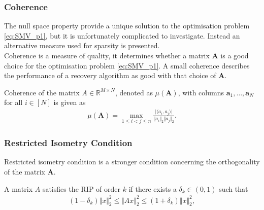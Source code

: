 \subsubsection{Coherence}
The null space property provide a unique solution to the optimisation problem \eqref{eq:SMV_p1}, but it is unfortunately complicated to investigate. Instead an alternative measure used for sparsity is presented.
\\
Coherence is a measure of quality, it determines whether a matrix $\mathbf{A}$ is a good choice for the optimisation problem \eqref{eq:SMV_p1}. A small coherence describes the performance of a recovery algorithm as good with that choice of $\mathbf{A}$. 
\begin{definition}[Coherence]
Coherence of the matrix $A \in \mathbb{R}^{M \times N}$, denoted as $\mu (\mathbf{A})$, with columns $\mathbf{a}_1, \dots, \mathbf{a}_N$ for all $i \in [N]$ is given as
\begin{align*}
\mu (\mathbf{A}) = \max_{1 \leq i < j \leq n} \frac{\vert \langle a_i, a_j \rangle \vert}{\Vert a_i \Vert_2 \Vert a_j \Vert_2}.
\end{align*}
\end{definition}

\subsubsection{Restricted Isometry Condition}
Restricted isometry condition is a stronger condition concerning the orthogonality of the matrix $\mathbf{A}$.
\begin{definition}
A matrix $A$ satisfies the RIP of order $k$ if there exists a $\delta_k \in (0,1)$ such that
\begin{align*}
(1 - \delta_k) \Vert x \Vert_2^2 \leq \Vert Ax \Vert_2^2 \leq (1 + \delta_k) \Vert x \Vert_2^2,
\end{align*}%
\end{definition}

